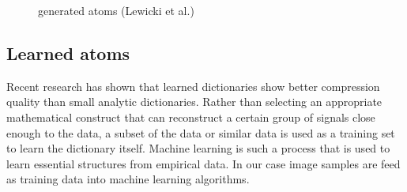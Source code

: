 \begin{figure}
\centering
{}
\hspace{5mm}
\hspace{5mm}
\caption[generated atoms]{generated atoms (Lewicki et al.\cite{Lewicki1999})}
\label{fig:generated_atoms}
\end{figure}

\subsection{Learned atoms}
Recent research\cite{Chen1998,Aharon2006,Mairal2010} has shown that learned
dictionaries show better compression quality than small analytic
dictionaries. Rather than selecting an appropriate mathematical construct that
can reconstruct a certain group of signals close enough to the data, a subset of
the data or similar data is used as a training set to learn the dictionary
itself.
Machine learning is such a process that is used to learn essential structures
from empirical data. In our case image samples are feed as training data into
machine learning algorithms.

